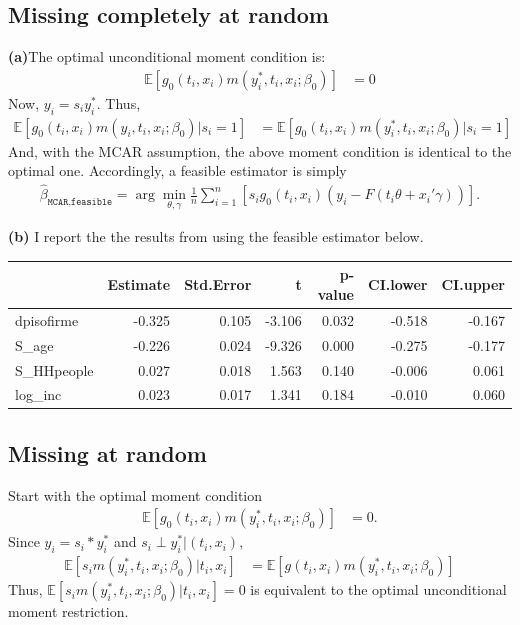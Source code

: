 \documentclass[12pt]{article}
\newcommand{\E}{\mathbb{E}}
\newcommand{\mtx}[1]{\ensuremath{\bm{\mathit{#1}}}}
\begin{document}
\subsection{Missing completely at random}
\textbf{(a)}The optimal unconditional moment condition is:
\begin{align*}
\E[\mtx{g}_0(t_i,\mtx{x}_i)m(y_i^*, t_i, \mtx{x}_i; \mtx{\beta}_0)] &=0
\end{align*}
Now, $y_i = s_iy_i^*$. Thus,
\begin{align*}
\E[\mtx{g}_0(t_i,\mtx{x}_i)m(y_i, t_i, \mtx{x}_i; \mtx{\beta}_0)|s_i = 1] &=\E[\mtx{g}_0(t_i,\mtx{x}_i)m(y_i^*, t_i, \mtx{x}_i; \mtx{\beta}_0)|s_i = 1] 
\end{align*}
And, with the MCAR assumption, the above moment condition is identical to the optimal one. Accordingly, a feasible estimator is simply
\begin{align*}
\hat{\mtx{\beta}}_{\texttt{MCAR,feasible}}= \arg \min_{\theta, \gamma} \frac{1}{n} \sum_{i=1}^n [s_i \mtx{g}_0(t_i,\mtx{x}_i)(y_i-F(t_i \theta+\mtx{x}_i'\mtx{\gamma}))].
\end{align*}

\textbf{(b)}
I report the the results from using the feasible estimator below.

\begin{table}[ht]
\centering
\begin{tabular}{lrrrrrr}
  \hline
 & Estimate & Std.Error & t & p-value & CI.lower & CI.upper \\ 
  \hline
dpisofirme & -0.325 & 0.105 & -3.106 & 0.032 & -0.518 & -0.167 \\ 
  S\_age & -0.226 & 0.024 & -9.326 & 0.000 & -0.275 & -0.177 \\ 
  S\_HHpeople & 0.027 & 0.018 & 1.563 & 0.140 & -0.006 & 0.061 \\ 
  log\_inc & 0.023 & 0.017 & 1.341 & 0.184 & -0.010 & 0.060 \\ 
   \hline
\end{tabular}
\end{table}


\subsection{Missing at random}
Start with the optimal moment condition
\begin{align*}
\E[\mtx{g}_0(t_i,\mtx{x}_i)m(y_i^*, t_i, \mtx{x}_i; \mtx{\beta}_0)] &=0.
\end{align*}
Since $y_i=s_i*y_i^*$ and $s_i \perp y_i^*|(t_i,x_i)$,
\begin{align*}
\E[s_i m(y_i^*, t_i, \mtx{x}_i; \mtx{\beta}_0)|t_i,x_i]&=\E[\mtx{g}(t_i,\mtx{x}_i)m(y_i^*, t_i, \mtx{x}_i; \mtx{\beta}_0)]
\end{align*}
Thus, $\E[s_i m(y_i^*,t_i,x_i; \beta_0)|t_i,x_i]=0$ is equivalent to the optimal unconditional moment restriction.\\
\end{document}
